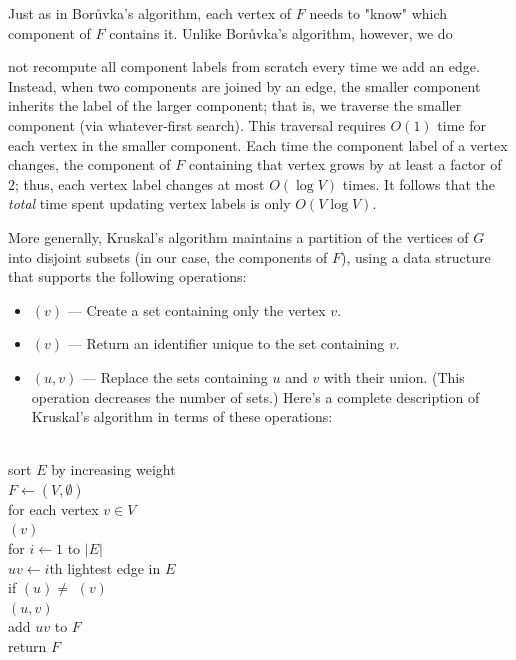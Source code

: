 Just as in Borůvka’s algorithm, each vertex of $F$ needs to "know" which component of $F$ contains it. Unlike Borůvka’s algorithm, however, we do

not recompute all component labels from scratch every time we add an edge. Instead, when two components are joined by an edge, the smaller component inherits the label of the larger component; that is, we traverse the smaller component (via whatever-first search). This traversal requires $O(1)$ time for each vertex in the smaller component. Each time the component label of a vertex changes, the component of $F$ containing that vertex grows by at least a factor of $2$; thus, each vertex label changes at most $O(\log  V)$ times. It follows that the \textit{total} time spent updating vertex labels is only $O(V \log  V)$.

More generally, Kruskal’s algorithm maintains a partition of the vertices of $G$ into disjoint subsets (in our case, the components of $F$), using a data structure that supports the following operations:

\begin{itemize}
\item {}$(v)$ — Create a set containing only the vertex $v$.
\item {}$(v)$ — Return an identifier unique to the set containing $v$.
\item {}$(u, v)$ — Replace the sets containing $u$ and $v$ with their union. (This operation decreases the number of sets.) Here’s a complete description of Kruskal’s algorithm in terms of these operations:
\end{itemize}

\begin{pseudocode}
\\
sort $E$ by increasing weight\\
$F\gets (V,\emptyset )$\\
for each vertex $v \in V$\\
\Indent {}$(v)$\\
for $i \gets 1$ to $|E|$\\
\Indent $uv \gets i$th lightest edge in $E$\\
\Indent if $(u) \neq$  $(v)$\\
\Indent\Indent {}$(u, v)$\\
\Indent\Indent add $uv$ to $F$\\
return $F$
\end{pseudocode}

